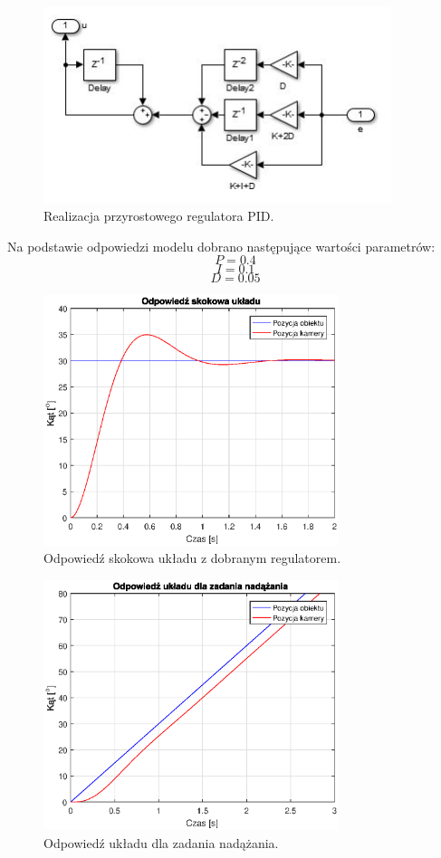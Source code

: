 \begin{figure}[h]
	\centering
	\includegraphics[width=4in]{Przyrostowy.jpg}
	\caption{Realizacja przyrostowego regulatora PID.}
	\label{fig:przyrostowy}
\end{figure}

Na podstawie odpowiedzi modelu dobrano następujące wartości parametrów:
\begin{equation}
P=0.4
\end{equation}
\begin{equation}
I=0.1
\end{equation}
\begin{equation}
D=0.05
\end{equation}

\begin{figure}[H]
	\centering
	\includegraphics[width=3.4in]{sim_step.eps}
	\caption{Odpowiedź skokowa układu z dobranym regulatorem.}
\label{fig:sim_step}
\end{figure}

\begin{figure}[H]
	\centering
	\includegraphics[width=3.4in]{sim_ramp.eps}
	\caption{Odpowiedź układu dla zadania nadążania.}
\label{fig:sim_ramp}
\end{figure}

